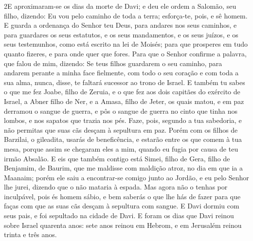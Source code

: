 \medskip

\lettrine{2} E aproximaram-se os dias da morte de Davi; e deu
ele ordem a Salomão, seu filho, dizendo: Eu vou pelo caminho de
toda a terra; esforça-te, pois, e sê homem. E guarda a ordenança
do Senhor teu Deus, para andares nos seus caminhos, e para guardares
os seus estatutos, e os seus mandamentos, e os seus juízos, e os
seus testemunhos, como está escrito na lei de Moisés; para que
prosperes em tudo quanto fizeres, e para onde quer que fores.
Para que o Senhor confirme a palavra, que falou de mim, dizendo:
Se teus filhos guardarem o seu caminho, para andarem perante a minha
face fielmente, com todo o seu coração e com toda a sua alma, nunca,
disse, te faltará sucessor ao trono de Israel. E também tu sabes
o que me fez Joabe, filho de Zeruia, e o que fez aos dois capitães
do exército de Israel, a Abner filho de Ner, e a Amasa, filho de
Jeter, os quais matou, e em paz derramou o sangue de guerra, e pôs o
sangue de guerra no cinto que tinha nos lombos, e nos sapatos que
trazia nos pés. Faze, pois, segundo a tua sabedoria, e não
permitas que suas cãs desçam à sepultura em paz. Porém com os
filhos de Barzilai, o gileadita, usarás de beneficência, e estarão
entre os que comem à tua mesa, porque assim se chegaram eles a mim,
quando eu fugia por causa de teu irmão Absalão. E eis que também
contigo está Simei, filho de Gera, filho de Benjamim, de Baurim, que
me maldisse com maldição atroz, no dia em que ia a Maanaim; porém
ele saiu a encontrar-se comigo junto ao Jordão, e eu pelo Senhor lhe
jurei, dizendo que o não mataria à espada. Mas agora não o
tenhas por inculpável, pois és homem sábio, e bem saberás o que lhe
hás de fazer para que faças com que as suas cãs desçam à sepultura
com sangue. E Davi dormiu com seus pais, e foi sepultado na
cidade de Davi. E foram os dias que Davi reinou sobre Israel
quarenta anos: sete anos reinou em Hebrom, e em Jerusalém reinou
trinta e três anos.

